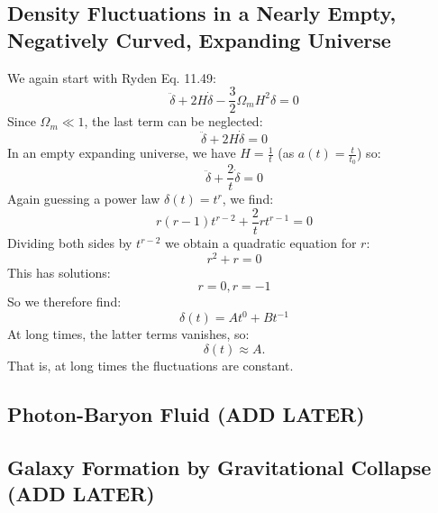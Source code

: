 \subsection{Density Fluctuations in a Nearly Empty, Negatively Curved, Expanding Universe}
We again start with Ryden Eq. 11.49:
\begin{equation}
    \ddot{\delta} + 2H\dot{\delta} - \frac{3}{2}\Omega_m H^2\delta = 0
\end{equation}
Since $\Omega_m \ll 1$, the last term can be neglected:
\begin{equation}
    \ddot{\delta} + 2H\dot{\delta} = 0
\end{equation}
In an empty expanding universe, we have $H = \frac{1}{t}$ (as $a(t) = \frac{t}{t_0}$) so:
\begin{equation}
    \ddot{\delta} + \frac{2}{t}\dot{\delta} = 0
\end{equation}
Again guessing a power law $\delta(t) = t^r$, we find:
\begin{equation}
    r(r-1)t^{r-2} + \frac{2}{t}rt^{r-1} = 0
\end{equation}
Dividing both sides by $t^{r-2}$ we obtain a quadratic equation for $r$:
\begin{equation}
    r^2 + r = 0
\end{equation}
This has solutions:
\begin{equation}
    r = 0, r = -1
\end{equation}
So we therefore find:
\begin{equation}
    \boxed{\delta(t) = At^0 + Bt^{-1}}
\end{equation}
At long times, the latter terms vanishes, so:
\begin{equation}
    \boxed{\delta(t) \approx A}.
\end{equation}
That is, at long times the fluctuations are constant.

\subsection{Photon-Baryon Fluid (ADD LATER)}
\subsection{Galaxy Formation by Gravitational Collapse (ADD LATER)}

\subsection{}

\subsection{}